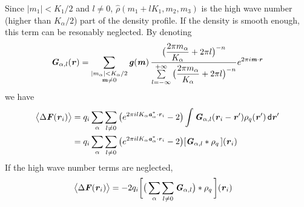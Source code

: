 \documentclass[aps,pre,preprint]{revtex4}
\renewcommand{\v}[1]{\textbf{\textit{#1}}}
\renewcommand{\d}[1]{\textsf{#1}}
\begin{document}
Since $\vert m_1\vert < K_1/2$ and $l\neq 0$, $\hat\rho(m_1+lK_1, m_2, m_3)$ is
the high wave number (higher than $K_\alpha / 2$) part of the density profile.
If the density is smooth enough, this term can be resonably neglected.
By denoting
\begin{align}
  \v G_{\alpha,l}(\v r) =
  \sum_{
    \begin{subarray}{c}
      \vert m_{\alpha}\vert < K_\alpha/2\\
      \v m\neq 0
    \end{subarray}}
  \v g(\v m)\,
  \frac
  {\big(\dfrac{2\pi m_\alpha}{K_\alpha} + 2\pi l\big)^{-n}}
  {\sum\limits_{l=-\infty}^{+\infty}
    \big(\dfrac{2\pi m_\alpha}{K_\alpha} + 2\pi l\big)^{-n}}
  e^{2\pi i\v m\cdot\v r}
\end{align}
we have
\begin{align}
  \big\langle
  \Delta\v F(\v r_i)
  \big\rangle
  &= 
  q_i\sum_{\alpha}\sum_{l\neq 0}
  \big(
  e^{2\pi i l K_\alpha\v a^\ast_\alpha\cdot \v r_i} - 2
  \big)
  \int
  \v G_{\alpha,l}(\v r_i - \v r') \rho_q(\v r')\,\d d\v r' \\
  & =
  q_i\sum_{\alpha}\sum_{l\neq 0}
  \big(
  e^{2\pi i l K_\alpha\v a^\ast_\alpha\cdot \v r_i} - 2
  \big)
  [\v G_{\alpha,l}\ast\rho_q\,] (\v r_i)
\end{align}
If the high wave number terms are neglected,
\begin{align}
  \big\langle
  \Delta\v F(\v r_i)
  \big\rangle
  & =
  - 2 q_i
  \bigg[
  \big(
  \sum_{\alpha}\sum_{l\neq 0}\v G_{\alpha,l}
  \big)
  \ast\rho_q\,
  \bigg] (\v r_i)
\end{align}
\end{document}
